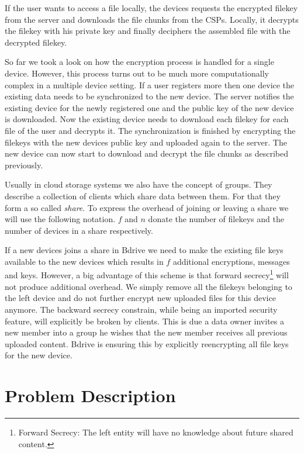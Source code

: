 If the user wants to access a file locally, the devices requests the encrypted filekey from the server and downloads the file chunks from the \ac{CSP}s. Locally, it decrypts the filekey with his private key and finally deciphers the assembled file with the decrypted filekey. 

So far we took a look on how the encryption process is handled for a single device. However, this process turns out to be much more computationally complex in a multiple device setting.  If a user registers more then one device the existing data needs to be synchronized to the new device. The server notifies the existing device for the newly registered one and the public key of the new device is downloaded. Now the existing device needs to download each filekey for each file of the user and decrypts it. The synchronization is finished by encrypting the filekeys with the new devices public key and uploaded again to the server. The new device can now start to download and decrypt the file chunks as described previously.

Usually in cloud storage systems we also have the concept of groups. They describe a collection of clients which share data between them. For that they form a so called \textit{share}. To express the overhead of joining or leaving a share we will use the following notation. $f$ and $n$ donate the number of filekeys and the number of devices in a share respectively.

If a new devices joins a share in Bdrive we need to make the existing file keys available to the new devices which results in $f$ additional encryptions, messages and keys. However, a big advantage of this scheme is that forward secrecy\footnote{Forward Secrecy: The left entity will have no knowledge about future shared content.} will not produce additional overhead. We simply remove all the filekeys belonging to the left device and do not further encrypt new uploaded files for this device anymore. The backward secrecy constrain, while being an imported security feature, will explicitly be broken by clients. This is due a data owner invites a new member into a group he wishes that the new member receives all previous uploaded content. Bdrive is ensuring this by explicitly reencrypting all file keys for the new device. 

\section{Problem Description}

